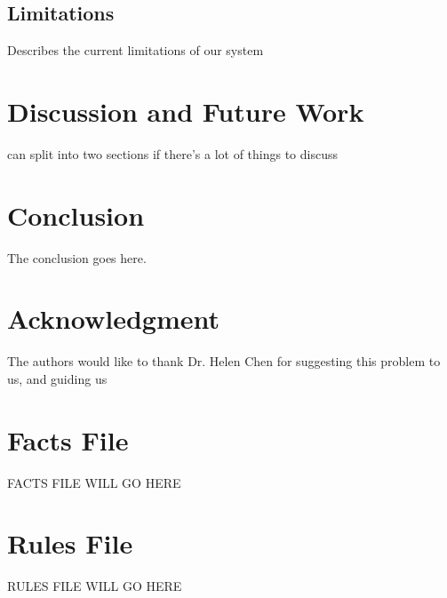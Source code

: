 \documentclass[conference]{IEEEtran}
\begin{document}
\subsection{Limitations}

Describes the current limitations of our system

\section{Discussion and Future Work}
\label{discFuture}

can split into two sections if there's a lot of things to discuss


\section{Conclusion}
\label{concl}
The conclusion goes here.






\section*{Acknowledgment}


The authors would like to thank Dr. Helen Chen for suggesting this problem to us, and guiding us  









\appendices

\section{Facts File}
\label{sec:facts-file}

FACTS FILE WILL GO HERE

\section{Rules File}
\label{sec:rules-file}

RULES FILE WILL GO HERE

\end{document}
